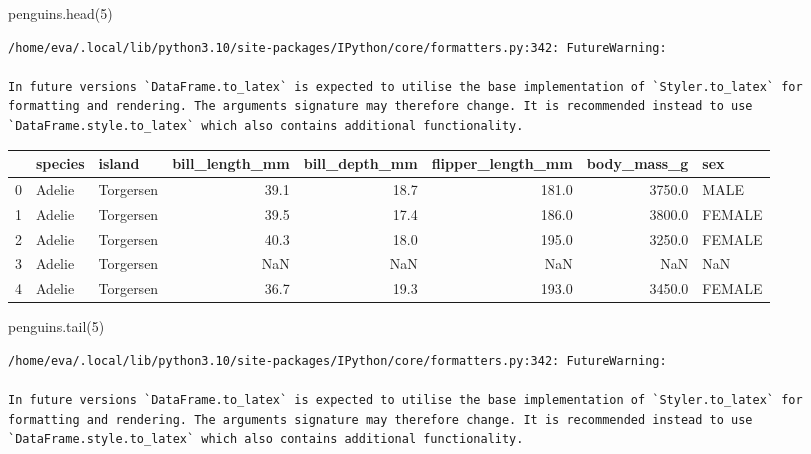 \documentclass[
  a4paper,
  noprof,
  12pt,
  notoc,
  nosols,
  nobib]{mnye}
\newenvironment{Shaded}{\begin{snugshade}}{\end{snugshade}}
\newcommand{\DecValTok}[1]{\textcolor[rgb]{0.68,0.00,0.00}{#1}}
\newcommand{\NormalTok}[1]{\textcolor[rgb]{0.00,0.23,0.31}{#1}}
\theoremstyle{definition}
\theoremstyle{remark}
\begin{document}
\begin{Shaded}
\begin{Highlighting}[]
\NormalTok{penguins.head(}\DecValTok{5}\NormalTok{)}
\end{Highlighting}
\end{Shaded}

\begin{verbatim}
/home/eva/.local/lib/python3.10/site-packages/IPython/core/formatters.py:342: FutureWarning:

In future versions `DataFrame.to_latex` is expected to utilise the base implementation of `Styler.to_latex` for formatting and rendering. The arguments signature may therefore change. It is recommended instead to use `DataFrame.style.to_latex` which also contains additional functionality.
\end{verbatim}

\begin{tabular}{lllrrrrl}
\toprule
{} & species &     island &  bill\_length\_mm &  bill\_depth\_mm &  flipper\_length\_mm &  body\_mass\_g &     sex \\
\midrule
0 &  Adelie &  Torgersen &            39.1 &           18.7 &              181.0 &       3750.0 &    MALE \\
1 &  Adelie &  Torgersen &            39.5 &           17.4 &              186.0 &       3800.0 &  FEMALE \\
2 &  Adelie &  Torgersen &            40.3 &           18.0 &              195.0 &       3250.0 &  FEMALE \\
3 &  Adelie &  Torgersen &             NaN &            NaN &                NaN &          NaN &     NaN \\
4 &  Adelie &  Torgersen &            36.7 &           19.3 &              193.0 &       3450.0 &  FEMALE \\
\bottomrule
\end{tabular}

\begin{Shaded}
\begin{Highlighting}[]
\NormalTok{penguins.tail(}\DecValTok{5}\NormalTok{)}
\end{Highlighting}
\end{Shaded}

\begin{verbatim}
/home/eva/.local/lib/python3.10/site-packages/IPython/core/formatters.py:342: FutureWarning:

In future versions `DataFrame.to_latex` is expected to utilise the base implementation of `Styler.to_latex` for formatting and rendering. The arguments signature may therefore change. It is recommended instead to use `DataFrame.style.to_latex` which also contains additional functionality.
\end{verbatim}
\end{document}
